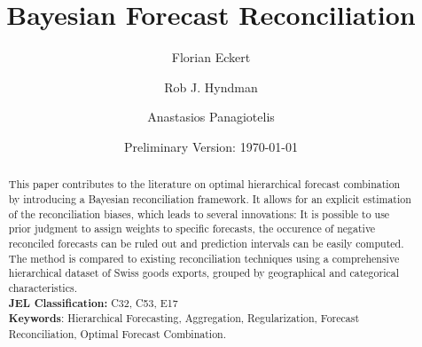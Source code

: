 


\title{\huge Bayesian Forecast Reconciliation}

\author[$\dagger$]{Florian Eckert}
\author[$\ddagger$]{Rob J. Hyndman}
\author[$\ddagger$]{Anastasios Panagiotelis}
\date{Preliminary Version: \today}

\maketitle
\begin{abstract}
This paper contributes to the literature on optimal hierarchical forecast combination by introducing a Bayesian reconciliation framework. It allows for an explicit estimation of the reconciliation biases, which leads to several innovations: It is possible to use prior judgment to assign weights to specific forecasts, the occurence of negative reconciled forecasts can be ruled out and prediction intervals can be easily computed. The method is compared to existing reconciliation techniques using a comprehensive hierarchical dataset of Swiss goods exports, grouped by geographical and categorical characteristics.\\

\noindent \textbf{JEL Classification:} C32, C53, E17 \\
\noindent \textbf{Keywords}: Hierarchical Forecasting, Aggregation, Regularization, Forecast Reconciliation, Optimal Forecast Combination.
\end{abstract}
\clearpage




\tableofcontents

\clearpage

\listoffigures
\listoftables

\clearpage


